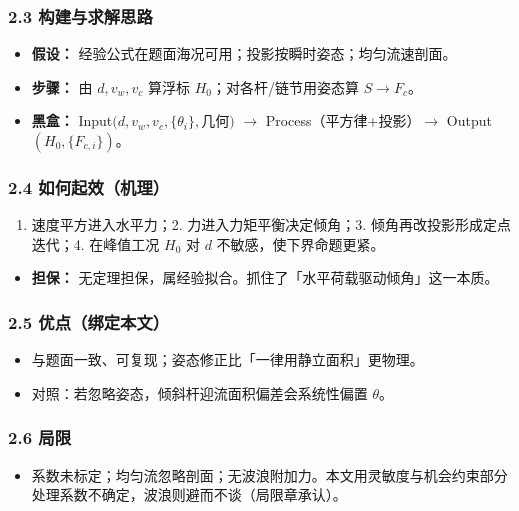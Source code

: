 \documentclass[UTF8,a4paper,zihao=-4]{ctexart}
\begin{document}
\subsubsection{\texorpdfstring{2.3 构建与求解思路}{2.3 构建与求解思路}}
\begin{itemize}[leftmargin=1.5em]
\item \textbf{假设：} 经验公式在题面海况可用；投影按瞬时姿态；均匀流速剖面。
\item \textbf{步骤：} 由 \(d,v_w,v_c\) 算浮标 \(H_0\)；对各杆/链节用姿态算 \(S\to F_c\)。
\item \textbf{黑盒：} Input\((d,v_w,v_c,\{\theta_i\},\)几何\()\) $\rightarrow$ Process（平方律+投影）$\rightarrow$ Output\((H_0,\{F_{c,i}\})\)。
\end{itemize}

\subsubsection{\texorpdfstring{2.4 如何起效（机理）}{2.4 如何起效（机理）}}
\begin{enumerate}[leftmargin=1.8em]
\item 速度平方进入水平力；2. 力进入力矩平衡决定倾角；3. 倾角再改投影形成定点迭代；4. 在峰值工况 \(H_0\) 对 \(d\) 不敏感，使下界命题更紧。  
\end{enumerate}
\begin{itemize}[leftmargin=1.5em]
\item \textbf{担保：} 无定理担保，属经验拟合。抓住了「水平荷载驱动倾角」这一本质。
\end{itemize}

\subsubsection{\texorpdfstring{2.5 优点（绑定本文）}{2.5 优点（绑定本文）}}
\begin{itemize}[leftmargin=1.5em]
\item 与题面一致、可复现；姿态修正比「一律用静立面积」更物理。  
\item 对照：若忽略姿态，倾斜杆迎流面积偏差会系统性偏置 \(\theta\)。
\end{itemize}

\subsubsection{\texorpdfstring{2.6 局限}{2.6 局限}}
\begin{itemize}[leftmargin=1.5em]
\item 系数未标定；均匀流忽略剖面；无波浪附加力。本文用灵敏度与机会约束部分处理系数不确定，波浪则避而不谈（局限章承认）。
\end{itemize}
\end{document}
